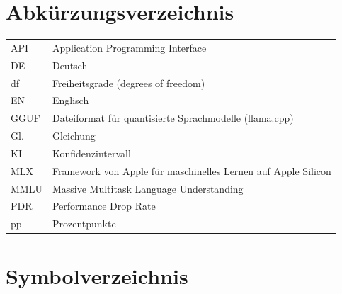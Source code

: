 \documentclass[a4paper,titlepage]{article}
\numberwithin{equation}{section} %
\begin{document}

\setcounter{page}{2}

\tableofcontents
\newpage

\listoffigures
\newpage

\listoftables
\newpage

\section*{Abkürzungsverzeichnis}

\begin{longtable}{@{}p{2.2cm}p{10cm}@{}}
API   & Application Programming Interface \\
DE    & Deutsch \\
df    & Freiheitsgrade (degrees of freedom) \\
EN    & Englisch \\
GGUF  & Dateiformat für quantisierte Sprachmodelle (llama.cpp) \\
Gl.   & Gleichung \\
KI    & Konfidenzintervall \\
MLX   & Framework von Apple für maschinelles Lernen auf Apple Silicon \\
MMLU  & Massive Multitask Language Understanding \\
PDR   & Performance Drop Rate \\
pp    & Prozentpunkte \\
\end{longtable}
\newpage

\section*{Symbolverzeichnis}
\end{document}
